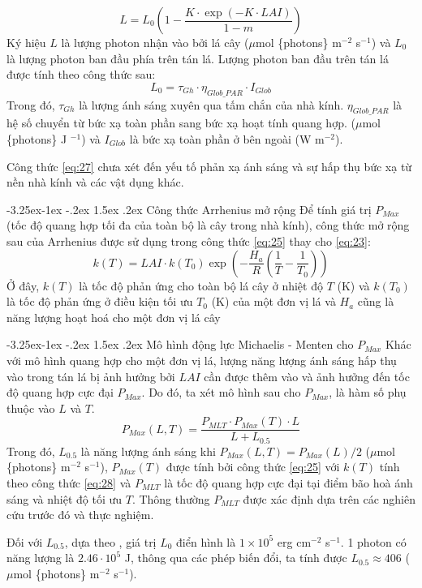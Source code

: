 \documentclass[a4paper]{article}
\makeatletter
\newcounter {subsubsubsection}[subsubsection]
\newcommand\subsubsubsection{\@startsection{subsubsubsection}{4}{\z@}%
                                     {-3.25ex\@plus -1ex \@minus -.2ex}%
                                     {1.5ex \@plus .2ex}%
                                     {\normalfont\normalsize\bfseries}}
\makeatother
\begin{document}
\begin{equation}\label{eq:27}
    L = L_{0}\left(1 - \frac{K\cdot \exp{(-K\cdot LAI)}}{1-m}\right)
\end{equation}
Ký hiệu $L$ là lượng photon nhận vào bởi lá cây ($\mu$mol \{photons\} m$^{-2}$ s$^{-1}$) và $L_0$ là lượng photon ban đầu phía trên tán lá. Lượng photon ban đầu trên tán lá được tính theo công thức sau:
\begin{equation}
    L_0 = \tau_{Gh}\cdot \eta_{Glob\_PAR} \cdot I_{Glob}    
\end{equation}
Trong đó, $\tau_{Gh}$ là lượng ánh sáng xuyên qua tấm chắn của nhà kính. $\eta_{Glob\_PAR}$ là hệ số chuyển từ bức xạ toàn phần sang bức xạ hoạt tính quang hợp. ($\mu$mol \{photons\} J $^{-1}$) và $I_{Glob}$ là bức xạ toàn phần ở bên ngoài (W m$^{-2}$). \par
Công thức \eqref{eq:27} chưa xét đến yếu tố phản xạ ánh sáng và sự hấp thụ bức xạ từ nền nhà kính và các vật dụng khác. 

\subsubsubsection{Công thức Arrhenius mở rộng}
Để tính giá trị $P_{Max}$ (tốc độ quang hợp tối đa của toàn bộ là cây trong nhà kính), công thức mở rộng sau của Arrhenius được sử dụng trong công thức \eqref{eq:25} thay cho \eqref{eq:23}:
\begin{equation}\label{eq:28}
    k(T) = LAI\cdot k(T_0)\exp{\left( -\dfrac{H_a}{R} \left( \dfrac{1}{T} - \dfrac{1}{T_0} \right)  \right)}
\end{equation}
Ở đây, $k(T)$ là tốc độ phản ứng cho toàn bộ lá cây ở nhiệt độ $T$ (K) và $k(T_0)$ là tốc độ phản ứng ở điều kiện tối ưu $T_0$ (K) của một đơn vị lá và $H_a$ cũng là năng lượng hoạt hoá cho một đơn vị lá cây

\subsubsubsection{Mô hình động lực Michaelis - Menten cho $P_{Max}$}
Khác với mô hình quang hợp cho một đơn vị lá, lượng năng lượng ánh sáng hấp thụ vào trong tán lá bị ảnh hưởng bởi $LAI$ cần được thêm vào và ảnh hưởng đến tốc độ quang hợp cực đại $P_{Max}$. Do đó, ta xét mô hình sau cho $P_{Max}$, là hàm số phụ thuộc vào $L$ và $T$.
\begin{equation}\label{eq:29}
    P_{Max}(L,T) = \frac{P_{MLT}\cdot P_{Max}(T)\cdot L}{L + L_{0.5}}
\end{equation}
Trong đó, $L_{0.5}$ là năng lượng ánh sáng khi $P_{Max}(L,T) = P_{Max}(L)/2$ \cite{Lommen1975} ($\mu$mol \{photons\} m$^{-2}$ s$^{-1}$), $P_{Max}(T)$ được tính bởi công thức \eqref{eq:25} với $k(T)$ tính theo công thức \eqref{eq:28} và $P_{MLT}$ là tốc độ quang hợp cực đại tại điểm bão hoà ánh sáng và nhiệt độ tối ưu $T$. Thông thường $P_{MLT}$ được xác định dựa trên các nghiên cứu trước đó và thực nghiệm. \par
Đối với $L_{0.5}$, dựa theo \cite{Lommen1975}, giá trị $L_{0}$ điển hình là $1\times 10^5$ erg cm$^{-2}$ s$^{-1}$. 1 photon có năng lượng là $2.46\cdot10^5$ J, thông qua các phép biến đổi, ta tính được $L_{0.5} \approx 406$ ($\mu$mol \{photons\} m$^{-2}$ s$^{-1}$). 
\end{document}
